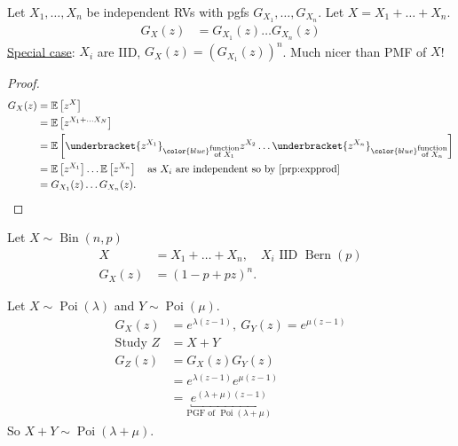\begin{proposition}
    Let $X_1, \dots, X_n$ be independent RVs with pgfs $G_{X_1}, \dots, G_{X_n}$.
    Let $X = X_1 + \dots + X_n$.
    \begin{align*}
        G_X(z) &= G_{X_1}(z) \dots G_{X_n}(z)
    \end{align*} 
    \underline{Special case}: $X_i$ are IID, $G_X(z) = \left( G_{X_1}(z) \right)^n$. \color{blue} Much nicer than PMF of $X$!
\end{proposition} 

\begin{proof}
    \begin{align*}
        G_X(z) &= \mathbb{E}\left[z^X\right] \\
        &= \mathbb{E}\left[z^{X_1 + \dots X_N}\right] \\
        &= \mathbb{E}\left[ \underbracket{z^{X_1}}_{\color{blue} \substack{\text{function} \\ \text{of $X_1$}}} z^{X_2} \dots \underbracket{z^{X_n}}_{\color{blue} \substack{\text{function} \\ \text{of $X_n$}}} \right] \\
        &= \mathbb{E}\left[ z^{X_1} \right] \dots \mathbb{E}\left[ z^{X_n} \right] \quad \text{as $X_i$ are independent so by \Cref{prp:expprod}}\\
        &= G_{X_1}(z) \dots G_{X_n}(z).
    \end{align*}
\end{proof} 

\begin{example}[Binomial]
    Let $X \sim \operatorname{Bin}(n, p)$
    \begin{align*}
        X &= X_1 + \dots + X_n, \quad X_i \text{ IID } \operatorname{Bern}(p) \\
        G_X(z) &= (1 - p + pz)^n.
    \end{align*} 
\end{example} 

\begin{example}[Q6, Sheet 3]
    Let $X \sim \operatorname{Poi}(\lambda)$ and $Y \sim \operatorname{Poi}(\mu)$.
    \begin{align*}
        G_X(z) &= e^{\lambda (z - 1)},\ G_Y(z) = e^{\mu (z - 1)} \\
        \text{Study } Z &= X + Y \\
        G_{Z}(z) &= G_X(z) G_Y(z) \\
        &= e^{\lambda (z - 1)} e^{\mu (z - 1)} \\
        &= \underbracket{e^{(\lambda + \mu)(z - 1)}}_{\text{PGF of $\operatorname{Poi}(\lambda + \mu)$}}
    \end{align*}
    So $X + Y \sim \operatorname{Poi}(\lambda + \mu)$.
\end{example} 

